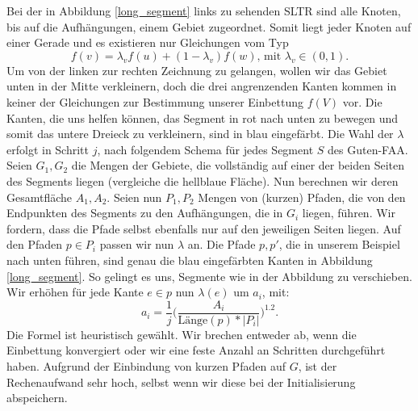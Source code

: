 \begin{example}\label{bsp_long_segment}
Bei der in Abbildung \ref{long_segment} links zu sehenden SLTR sind alle Knoten, bis auf die Aufhängungen, einem Gebiet zugeordnet. Somit liegt jeder Knoten auf einer Gerade und es existieren nur Gleichungen vom Typ
$$ f(v) = \lambda_v f(u) + (1-\lambda_v)f(w) \text{, mit } \lambda_v \in (0,1).$$
Um von der linken zur rechten Zeichnung zu gelangen, wollen wir das Gebiet unten in der Mitte verkleinern, doch die drei angrenzenden Kanten kommen in keiner der Gleichungen zur Bestimmung unserer Einbettung $f(V)$ vor. Die Kanten, die uns helfen können, das Segment in rot nach unten zu bewegen und somit das untere Dreieck zu verkleinern, sind in blau eingefärbt. Die Wahl der $\lambda$ erfolgt in Schritt $j$, nach folgendem Schema für jedes Segment $S$ des Guten-FAA. Seien $G_1,G_2$ die Mengen der Gebiete, die vollständig auf einer der beiden Seiten des Segments liegen (vergleiche die hellblaue Fläche). Nun berechnen wir deren Gesamtfläche $A_1,A_2$. Seien nun $P_1,P_2$ Mengen von (kurzen) Pfaden, die von den Endpunkten des Segments zu den Aufhängungen, die in $G_i$ liegen, führen. Wir fordern, dass die Pfade selbst ebenfalls nur auf den jeweiligen Seiten liegen. Auf den Pfaden $p \in P_i$ passen wir nun $\lambda$ an. Die Pfade $p,p'$, die in unserem Beispiel nach unten führen, sind genau die blau eingefärbten Kanten in Abbildung \ref{long_segment}. So gelingt es uns, Segmente wie in der Abbildung zu verschieben. Wir erhöhen für jede Kante $e \in p$ nun $\lambda(e)$ um $a_i$, mit:
$$ a_i = \frac{1}{j} \Big( \frac{A_i}{\text{Länge}(p)*|P_i|}\Big)^{1.2}.$$
Die Formel ist heuristisch gewählt. Wir brechen entweder ab, wenn die Einbettung konvergiert oder wir eine feste Anzahl an Schritten durchgeführt haben. Aufgrund der Einbindung von kurzen Pfaden auf $G$, ist der Rechenaufwand sehr hoch, selbst wenn wir diese bei der Initialisierung abspeichern.
\end{example}

